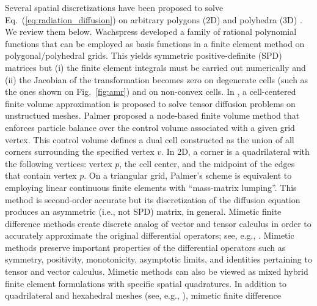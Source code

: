 \documentclass[preprint,10pt]{elsarticle}
\newcommand{\eqt}[1]{Eq.~(\ref{#1})}                     %
\newcommand{\fig}[1]{Fig.~\ref{#1}}                      %
\begin{document}
Several spatial discretizations have been proposed to solve \eqt{eq:radiation_diffusion} on
arbitrary polygons (2D) and polyhedra (3D) \cite{Wachspress,Palmer2001,Kuznetsov2004,Brezzi2005,
LipnikovShashkovSvyatskiy2006,BaileyPhD,BaileyAdams2008,LipnikovShashkov2010}. We review them below.
%
Wachspress \cite{Wachspress} developed a family of rational polynomial functions that can be employed
as basis functions in a finite element method on polygonal/polyhedral grids. This yields
symmetric positive-definite (SPD) matrices but (i) the finite element integrals must be carried out 
numerically and (ii) the Jacobian of the transformation becomes zero on degenerate cells 
(such as the ones shown on \fig{fig:amr}) and on non-convex cells. 
%
In \cite{Herbin2006}, a cell-centered finite volume approximation is proposed to solve tensor diffusion problems
on unstructued meshes.
%
Palmer \cite{Palmer2001,PalmerLLNL} proposed a node-based finite volume method 
that enforces particle balance over the control volume associated with a given grid vertex.
This control volume defines a dual cell constructed as 
the union of all corners surrounding the specified vertex $v$. In 2D, a corner 
is a quadrilateral with the following vertices: vertex $p$, the cell center, and the midpoint
of the edges that contain vertex $p$. On a triangular grid, Palmer's scheme is equivalent 
to employing linear continuous finite elements with ``mass-matrix lumping''. This method is 
second-order accurate but its discretization of the diffusion equation produces an 
asymmetric (i.e., not SPD) matrix, in general.
%
Mimetic finite difference methods create discrete analog of vector and tensor
calculus in order to accurately approximate the original differential operators;
see, e.g., \cite{HymanMorelShashkovSteinberg2002}.
Mimetic methods preserve important properties of the differential operators such 
as symmetry, positivity, monotonicity, asymptotic limits, and identities pertaining 
to tensor and vector calculus. Mimetic methods can also be viewed as mixed hybrid 
finite element formulations with specific spatial quadratures.  
In addition to quadrilateral and hexahedral meshes (see, e.g., 
\cite{MorelRobertsShashkov1998,MorelHallShashkov2001}), mimetic finite difference 
\end{document}
